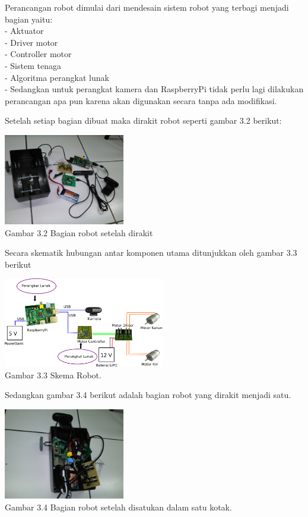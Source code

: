 \documentclass[10pt,journal,compsoc]{IEEEtran}
\begin{document}
  Perancangan robot dimulai dari mendesain sistem robot yang terbagi menjadi bagian yaitu:\\
  - Aktuator\\
  - Driver motor\\
  - Controller motor\\
  - Sistem tenaga\\
  - Algoritma perangkat lunak\\
  - Sedangkan untuk perangkat kamera dan RaspberryPi tidak perlu lagi dilakukan perancangan apa pun karena akan digunakan secara tanpa ada modifikasi.
  
  Setelah setiap bagian dibuat maka dirakit robot seperti gambar 3.2 berikut:
  
  \begin{center}
    \includegraphics[width=150pt]{apart}\\
    Gambar 3.2 Bagian robot setelah dirakit
  \end{center}
  
  Secara skematik hubungan antar komponen utama ditunjukkan oleh gambar 3.3 berikut
  \begin{center}
    \includegraphics[width=200pt]{desain_jadi}\\
    Gambar 3.3 Skema Robot.
  \end{center}
  
  Sedangkan gambar 3.4 berikut adalah bagian robot yang dirakit menjadi satu.
  \begin{center}
    \includegraphics[width=150pt]{full}\\
    Gambar 3.4 Bagian robot setelah disatukan dalam satu kotak.
  \end{center}
  
\end{document}
